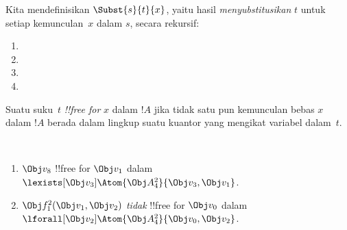 \documentclass[../../../include/open-logic-section]{subfiles}
\begin{document}


\begin{defn}
Kita mendefinisikan $\Subst{s}{t}{x}$, yaitu hasil
\emph{menyubstitusikan} $t$ untuk setiap kemunculan~$x$ dalam $s$, secara
rekursif:
\begin{enumerate}
\item {}

\item {}

\item {}

\item{}
\end{enumerate}
\end{defn}

\begin{defn}
Suatu suku~$t$ \emph{!!{free for}} $x$ dalam $!A$ jika tidak satu pun
kemunculan bebas $x$ dalam $!A$ berada dalam lingkup suatu kuantor yang
mengikat variabel dalam~$t$.
\end{defn}

\begin{ex} ~
\begin{enumerate}
\item $\Obj v_8$ !!{free for} $\Obj v_1$ dalam $\lexists[\Obj
  v_3]\Atom{\Obj A^2_4}{\Obj v_3,\Obj v_1}$.

\item $\Obj f^2_1(\Obj v_1, \Obj v_2)$ \emph{tidak} !!{free for} $\Obj
  v_0$ dalam $\lforall[\Obj v_2]\Atom{\Obj A^2_4}{\Obj v_0,\Obj v_2}$.
\end{enumerate}
\end{ex}
\end{document}

